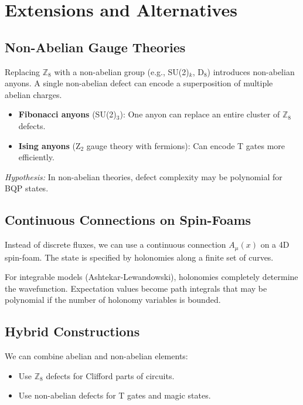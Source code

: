 \section{Extensions and Alternatives}

\subsection{Non-Abelian Gauge Theories}

Replacing $\mathbb{Z}_8$ with a non-abelian group (e.g., SU(2)$_k$, D$_8$) introduces non-abelian anyons. A single non-abelian defect can encode a superposition of multiple abelian charges.

\begin{itemize}
    \item \textbf{Fibonacci anyons} (SU(2)$_3$): One anyon can replace an entire cluster of $\mathbb{Z}_8$ defects.
    \item \textbf{Ising anyons} (Z$_2$ gauge theory with fermions): Can encode T gates more efficiently.
\end{itemize}

\textit{Hypothesis:} In non-abelian theories, defect complexity may be polynomial for BQP states.

\subsection{Continuous Connections on Spin-Foams}

Instead of discrete fluxes, we can use a continuous connection $A_\mu(x)$ on a 4D spin-foam. The state is specified by holonomies along a finite set of curves.

For integrable models (Ashtekar-Lewandowski), holonomies completely determine the wavefunction. Expectation values become path integrals that may be polynomial if the number of holonomy variables is bounded.

\subsection{Hybrid Constructions}

We can combine abelian and non-abelian elements:
\begin{itemize}
    \item Use $\mathbb{Z}_8$ defects for Clifford parts of circuits.
    \item Use non-abelian defects for T gates and magic states.
\end{itemize}

